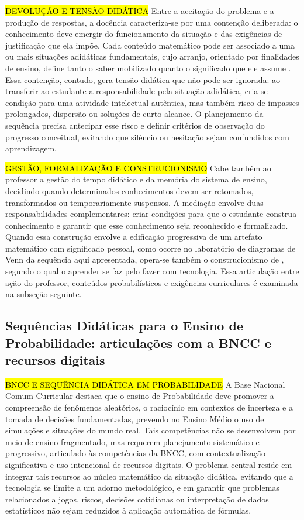 {\hl {DEVOLUÇÃO E TENSÃO DIDÁTICA} Entre a aceitação do problema e a produção de respostas, a docência caracteriza-se por uma contenção deliberada: o conhecimento deve emergir do funcionamento da situação e das exigências de justificação que ela impõe. Cada conteúdo matemático pode ser associado a uma ou mais situações adidáticas fundamentais, cujo arranjo, orientado por finalidades de ensino, define tanto o saber mobilizado quanto o significado que ele assume \cite[p.~30-31, p.~230]{brousseau1997}. Essa contenção, contudo, gera tensão didática que não pode ser ignorada: ao transferir ao estudante a responsabilidade pela situação adidática, cria-se condição para uma atividade intelectual autêntica, mas também risco de impasses prolongados, dispersão ou soluções de curto alcance. O planejamento da sequência precisa antecipar esse risco e definir critérios de observação do progresso conceitual, evitando que silêncio ou hesitação sejam confundidos com aprendizagem.

\hl {GESTÃO, FORMALIZAÇÃO E CONSTRUCIONISMO} Cabe também ao professor a gestão do tempo didático e da memória do sistema de ensino, decidindo quando determinados conhecimentos devem ser retomados, transformados ou temporariamente suspensos. A mediação envolve duas responsabilidades complementares: criar condições para que o estudante construa conhecimento e garantir que esse conhecimento seja reconhecido e formalizado. Quando essa construção envolve a edificação progressiva de um artefato matemático com significado pessoal, como ocorre no laboratório de diagramas de Venn da sequência aqui apresentada, opera-se também o construcionismo de , segundo o qual o aprender se faz pelo fazer com tecnologia. Essa articulação entre ação do professor, conteúdos probabilísticos e exigências curriculares é examinada na subseção seguinte.

\subsection{Sequências Didáticas para o Ensino de Probabilidade: articulações com a BNCC e recursos digitais}

\hl{BNCC E SEQUÊNCIA DIDÁTICA EM PROBABILIDADE} A Base Nacional Comum Curricular \cite[p.~520, 523, 528, 531]{brasil2018} destaca que o ensino de Probabilidade deve promover a compreensão de fenômenos aleatórios, o raciocínio em contextos de incerteza e a tomada de decisões fundamentadas, prevendo no Ensino Médio o uso de simulações e situações do mundo real. Tais competências não se desenvolvem por meio de ensino fragmentado, mas requerem planejamento sistemático e progressivo, articulado às competências da BNCC, com contextualização significativa e uso intencional de recursos digitais. O problema central reside em integrar tais recursos ao núcleo matemático da situação didática, evitando que a tecnologia se limite a um adorno metodológico, e em garantir que problemas relacionados a jogos, riscos, decisões cotidianas ou interpretação de dados estatísticos não sejam reduzidos à aplicação automática de fórmulas.

}
